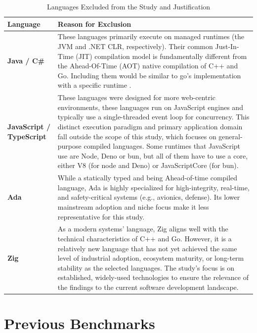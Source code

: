\begin{table}
	\centering
	\caption{Languages Excluded from the Study and Justification}
	\label{tab:excluded_languages}
	\begin{tabularx}{\textwidth}{
		>{\raggedright\arraybackslash}p{}
		>{\raggedright\arraybackslash}X
	}
		\toprule
		\textbf{Language} & \textbf{Reason for Exclusion} \\
		\midrule
		
		\textbf{Java / C\#} &
		These languages primarily execute on managed runtimes (the JVM and .NET CLR, respectively). Their common Just-In-Time (JIT) compilation model is fundamentally different from the Ahead-Of-Time (AOT) native compilation of C++ and Go. Including them would be similar to go's implementation with a specific runtime . \\
		\addlinespace
		
		\textbf{JavaScript / TypeScript} &
		These languages were designed for more web-centric environments, these languages run on JavaScript engines and typically use a single-threaded event loop for concurrency. This distinct execution paradigm and primary application domain fall outside the scope of this study, which focuses on general-purpose compiled languages. Some runtimes that JavaScript use are Node, Deno or bun, but all of them have to use a core, either \gls{V8} (for node and Deno) or JavaScriptCore (for bun). \\
		\addlinespace
		
		\textbf{Ada} &
		While a statically typed and being Ahead-of-time compiled language, Ada is highly specialized for high-integrity, real-time, and safety-critical systems (e.g., avionics, defense). Its lower mainstream adoption and niche focus make it less representative for this study. \\
		\addlinespace
		
		\textbf{Zig} &
		As a modern systems' language, Zig aligns well with the technical characteristics of C++ and Go. However, it is a relatively new language that has not yet achieved the same level of industrial adoption, ecosystem maturity, or long-term stability as the selected languages. The study's focus is on established, widely-used technologies to ensure the relevance of the findings to the current software development landscape. \\
		\bottomrule
	\end{tabularx}
\end{table}


\section{Previous Benchmarks}

